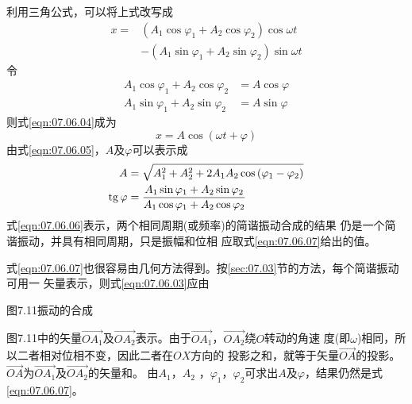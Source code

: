 利用三角公式，可以将上式改写成
\begin{equation}\label{eqn:07.06.04}
	\begin{aligned}
		x =& \left( A _ { 1 } \cos \varphi _ { 1 } + A _ { 2 } \cos \varphi _ { 2 } \right) \cos \omega t \\
		&- \left( A _ { 1 } \sin \varphi _ { 1 } + A _ { 2 } \sin \varphi _ { 2 } \right) \sin \omega t
	\end{aligned}
\end{equation}
令
\begin{equation}\label{eqn:07.06.05}
	\begin{aligned}
		A _ { 1 } \cos \varphi _ { 1 } + A _ { 2 } \cos \varphi _ { 2 } &= A  \cos \varphi  \\
		A _ { 1 } \sin \varphi _ { 1 } + A _ { 2 }  \sin \varphi _ { 2 } &= A  \sin \varphi
	\end{aligned}
\end{equation}
则式\eqref{eqn:07.06.04}成为
\begin{equation}\label{eqn:07.06.06}
	x = A  \cos \left( \omega t +  \varphi \right)
\end{equation}
由式\ref{eqn:07.06.05}，$ A $及$ \varphi $可以表示成
\begin{equation}\label{eqn:07.06.07}
    \begin{split}
    A &= \sqrt { A _ { 1 } ^ { 2 } + A _ 2 ^ { 2 } + 2 A _ { 1 } A _ { 2 }  \cos \left( \varphi _ { 1 } -  \varphi _ { 2 } \right) } \\
    \operatorname{tg} \varphi &= \frac { A _ { 1 }  \sin \varphi _ { 1 } + A _ { 2 } \sin \varphi _ { 2 } } { A _ { 1 }  \cos \varphi _ { 1 } + A _ { 2 } \cos \varphi _ { 2 } }
    \end{split}
\end{equation}
式\eqref{eqn:07.06.06}表示，两个相同周期(或频率)的简谐振动合成的结果
仍是一个简谐振动，并具有相同周期，只是振幅和位相
应取式\eqref{eqn:07.06.07}给出的值。

式\eqref{eqn:07.06.07}也很容易由几何方法得到。按\ref{sec:07.03}节的方法，每个简谐振动可用一
矢量表示，则式\eqref{eqn:07.06.03}应由

图7.11振动的合成

图7.11中的矢量$ \vec{OA_1} $及$ \vec{OA_2} $表示。由于$ \vec{ O A _ { 1 } } $，$ \vec{ O A _ { 2 } } $绕$ O $转动的角速
度(即$ \omega $)相同，所以二者相对位相不变，因此二者在$ OX $方向的
投影之和，就等于矢量$\vec{OA}$的投影。$ \vec{OA} $为$\vec{OA_1}$及$\vec{OA_2}$的矢量和。
由$  A _ { 1 }   $，$  A _ { 2 }  $ ，$\varphi_{ 1 }$，$\varphi_{ 2 }$可求出$ A $及$\varphi$，结果仍然是式\eqref{eqn:07.06.07}。


